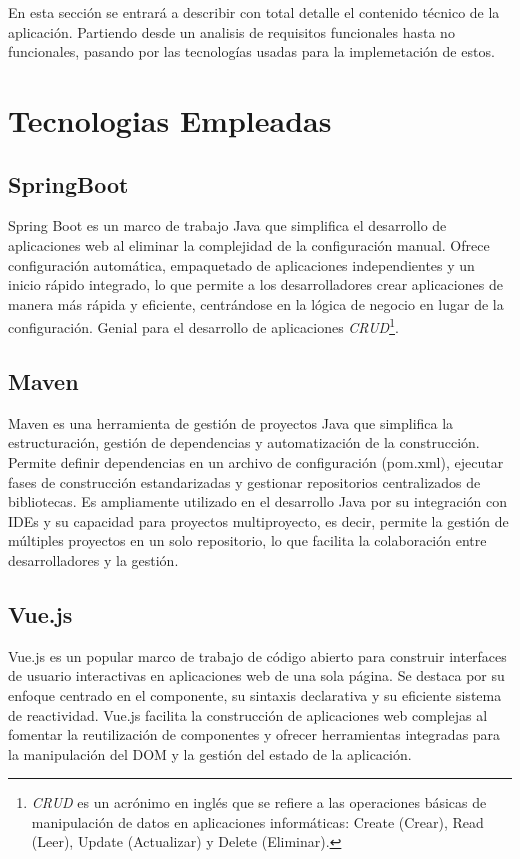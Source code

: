 En esta sección se entrará a describir con total detalle el contenido técnico de la aplicación. Partiendo desde un analisis de requisitos funcionales
hasta no funcionales, pasando por las tecnologías usadas para la implemetación de estos. 

\section{Tecnologias Empleadas}

\subsection{SpringBoot}
Spring Boot es un marco de trabajo Java que simplifica el desarrollo de aplicaciones web al eliminar la 
complejidad de la configuración manual. Ofrece configuración automática, empaquetado de aplicaciones independientes y un inicio rápido integrado, 
lo que permite a los desarrolladores crear aplicaciones de manera más rápida y eficiente, centrándose en la lógica de negocio en lugar de la configuración. 
Genial para el desarrollo de aplicaciones \textit{CRUD}\footnote{\textit{CRUD} es un acrónimo en inglés que se refiere a las operaciones 
básicas de manipulación de datos en aplicaciones informáticas: Create (Crear), Read (Leer), Update (Actualizar) y Delete (Eliminar).}.
\subsection{Maven}
Maven es una herramienta de gestión de proyectos Java que simplifica la estructuración, gestión de dependencias y automatización de la construcción. 
Permite definir dependencias en un archivo de configuración (pom.xml), ejecutar fases de construcción estandarizadas y gestionar repositorios 
centralizados de bibliotecas. Es ampliamente utilizado en el desarrollo Java por su integración con IDEs y su capacidad para proyectos multiproyecto, es decir,
permite la gestión de múltiples proyectos en un solo repositorio, lo que facilita la colaboración entre desarrolladores y la gestión.
\subsection{Vue.js}
Vue.js es un popular marco de trabajo de código abierto para construir interfaces de usuario interactivas en aplicaciones web de una sola página. 
Se destaca por su enfoque centrado en el componente, su sintaxis declarativa y su eficiente sistema de reactividad. Vue.js facilita la construcción 
de aplicaciones web complejas al fomentar la reutilización de componentes y ofrecer herramientas integradas para la manipulación del DOM y la gestión 
del estado de la aplicación.

